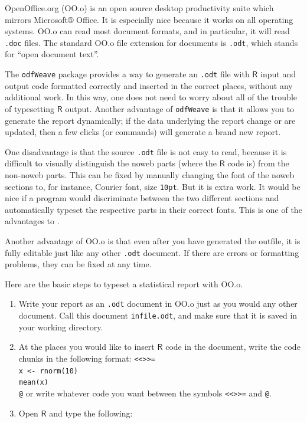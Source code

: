 \documentclass[captions=tableheading]{scrbook}
\begin{document}
\begin{example}
OpenOffice.org (OO.o) is an open source desktop productivity suite which mirrors Microsoft\(\circledR\) Office. It is especially nice because it works on all operating systems. OO.o can read most document formats, and in particular, it will read \texttt{.doc} files. The standard OO.o file extension for documents is \texttt{.odt}, which stands for ``open document text''.

The \texttt{odfWeave}  package \cite{odfweave} provides a way to generate an \texttt{.odt} file with \(\mathsf{R}\) input and output code formatted correctly and inserted in the correct places, without any additional work. In this way, one does not need to worry about all of the trouble of typesetting \(\mathsf{R}\) output. Another advantage of \texttt{odfWeave} is that it allows you to generate the report dynamically; if the data underlying the report change or are updated, then a few clicks (or commands) will generate a brand new report.

One disadvantage is that the source \texttt{.odt}  file is not easy to read, because it is difficult to visually distinguish the noweb parts (where the \(\mathsf{R}\) code is) from the non-noweb parts. This can be fixed by manually changing the font of the noweb sections to, for instance, Courier font, size \texttt{10pt}. But it is extra work. It would be nice if a program would discriminate between the two different sections and automatically typeset the respective parts in their correct fonts. This is one of the advantages to \LyX{}.

Another advantage of OO.o is that even after you have generated the outfile, it is fully editable just like any other \texttt{.odt} document. If there are errors or formatting problems, they can be fixed at any time.

Here are the basic steps to typeset a statistical report with OO.o.

\begin{enumerate}
\item Write your report as an \texttt{.odt} document in OO.o just as you would any other document. Call this document \texttt{infile.odt}, and make sure that it is saved in your working directory.
\item At the places you would like to insert \(\mathsf{R}\) code in the document, write the code chunks in the following format:
   \texttt{<\textcompwordmark{}<>\textcompwordmark{}>=}~\\
   \texttt{x <- rnorm(10)}~\\
   \texttt{mean(x)}~\\
   \texttt{@}
   or write whatever code you want between the symbols \texttt{<\textcompwordmark{}<>\textcompwordmark{}>=} and \texttt{@}.
\item Open \(\mathsf{R}\) and type the following:
\end{enumerate}


\end{example}
\end{document}
